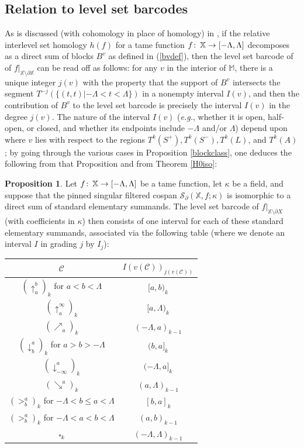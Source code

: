 \documentclass[11pt]{amsart}
\theoremstyle{definition}
\newtheorem{prop}[theorem]{Proposition}
\theoremstyle{remark}
\numberwithin{equation}{section}
\def\co{\colon\thinspace}
\begin{document}
\subsection{Relation to level set barcodes}
As is discussed (with cohomology in place of homology) in \cite[Section 3.2.1]{BBF21}, if the relative interlevel set homology $h(f)$ for a tame function $f\co \mathbb{X}\to [-\Lambda,\Lambda]$ decomposes as a direct sum of blocks $B^v$ as defined in (\ref{bvdef}), then the level set barcode of \cite{CDM} of $f|_{\mathbb{X}\setminus\partial\mathbb{X}}$ can be read off as follows: for any $v$ in the interior of
 $\mathbb{M}$, there is a unique integer $j(v)$ with the property that the support of $B^v$ intersects the segment $T^{-j}(\{(t,t)|-\Lambda<t<\Lambda\})$ in a nonempty interval $I(v)$, and then the contribution of $B^v$ to the level set barcode is precisely the interval $I(v)$ in the degree $j(v)$. The nature of the interval $I(v)$ (\emph{e.g.}, whether it is open, half-open, or closed, and whether its endpoints include $-\Lambda$ and/or $\Lambda$) depend upon where $v$ lies with respect to the regions $T^{k}(S^+),T^k(S^-),T^k(L)$, and $T^k(A)$; by going through the various cases in Proposition \ref{blockclass}, one deduces the following from that Proposition and from Theorem \ref{H0iso}:

\begin{prop}\label{barclass}
	Let $f\co \mathbb{X}\to [-\Lambda,\Lambda]$ be a tame function, let $\kappa$ be a field, and suppose that the pinned singular filtered cospan $\mathcal{S}_{\partial}(\mathbb{X},f;\kappa)$ is isomorphic to a direct sum of standard elementary summands.  The level set barcode of $f|_{\mathbb{X}\setminus\partial{X}}$ (with coefficients in $\kappa$) then consists of one interval for each of these standard elementary summands, associated via the following table (where we denote an interval $I$ in grading $j$ by $I_j$):
	\begin{center}
		\begin{tabular}{c|c} $\mathcal{C}$ & $I(v(\mathcal{C}))_{j(v(\mathcal{C}))}$  \\ 	\hline $\left(\uparrow_{a}^{b}\right)_k$ for $a<b<\Lambda$ & $[a,b)_k$  \\ \hline $\left(\uparrow_{a}^{\infty}\right)_k$ &  $[a,\Lambda)_k$\\ 
			\hline $\left(\nearrow_{a}\right)_k$ & $(-\Lambda,a)_{k-1}$ \\ \hline $\left(\downarrow^{a}_{b}\right)_{k}$ for $a>b>-\Lambda$ & $(b,a]_k$ \\ \hline 
			$\left(\downarrow^{a}_{-\infty}\right)_{k}$ &  $(-\Lambda,a]_k$ \\ \hline $\left(\searrow^{a}\right)_k$ &  $(a,\Lambda)_{k-1}$ \\ \hline $\left(>_{b}^{a}\right)_k$ for $-\Lambda<b\leq a<\Lambda$ & $[b,a]_k$ \\ 
			\hline $\left(>_{b}^{a}\right)_k$ for $-\Lambda<a< b<\Lambda$ & $(a,b)_{k-1}$ \\ \hline $\square_k$ & $(-\Lambda,\Lambda)_{k-1}$
		\end{tabular}
	\end{center}
	\end{prop}
\end{document}

